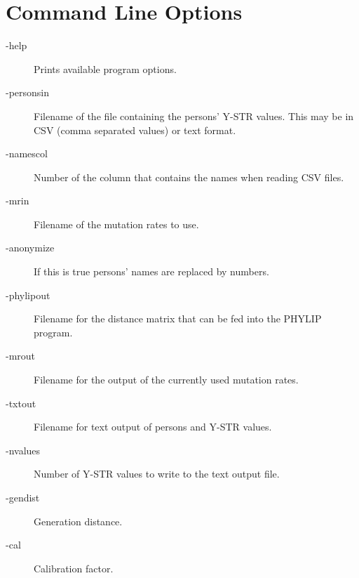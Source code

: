 \section{Command Line Options}

\begin{description}
\item[-help] Prints available program options.
\item[-personsin] Filename of the file containing the persons' Y-STR values.
	This may be in CSV (comma separated values) or text format.
\item[-namescol] Number of the column that contains the names
	when reading CSV files.
\item[-mrin] Filename of the mutation rates to use.
\item[-anonymize] If this is true persons' names are replaced by numbers.
\item[-phylipout] Filename for the distance matrix that can be fed into
	the PHYLIP\cite{Phylip} program.
\item[-mrout] Filename for the output of the currently used mutation rates.
\item[-txtout] Filename for text output of persons and Y-STR values.
\item[-nvalues] Number of Y-STR values to write to the text output file.
\item[-gendist] Generation distance.
\item[-cal] Calibration factor.
\end{description}


